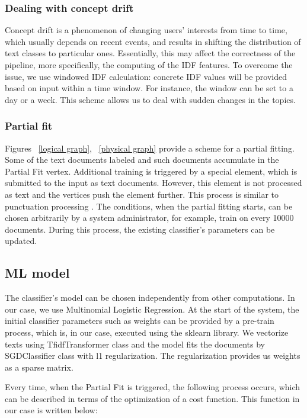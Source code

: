 \subsubsection{Dealing with concept drift}

Concept drift is a phenomenon of changing users' interests from time to time, which usually depends on recent events, and results in shifting the distribution of text classes to particular ones. Essentially, this may affect the correctness of the pipeline, more specifically, the computing of the IDF features. To overcome the issue, we use windowed IDF calculation: concrete IDF values will be provided based on input within a time window. For instance, the window can be set to a day or a week. This scheme allows us to deal with sudden changes in the topics.

\subsubsection{Partial fit}

Figures ~\ref{logical graph}, ~\ref{physical graph} provide a scheme for a partial fitting. Some of the text documents labeled and such documents accumulate in the Partial Fit vertex. Additional training is triggered by a special element, which is submitted to the input as text documents. However, this element is not processed as text and the vertices push the element further. This process is similar to punctuation processing \cite{tucker2003exploiting}. The conditions, when the partial fitting starts, can be chosen arbitrarily by a system administrator, for example, train on every 10000 documents. During this process, the existing classifier's parameters can be updated.

\subsection{ML model \label{ML}}

The classifier's model can be chosen independently from other computations. In our case, we use Multinomial Logistic Regression. At the start of the system, the initial classifier parameters such as weights can be provided by a pre-train process, which is, in our case, executed using the sklearn library. We vectorize texts using TfidfTransformer class and the model fits the documents by SGDClassifier class with l1 regularization. The regularization provides us weights as a sparse matrix.

Every time, when the Partial Fit is triggered, the following process occurs, which can be described in terms of the optimization of a cost function. This function in our case is written below:

